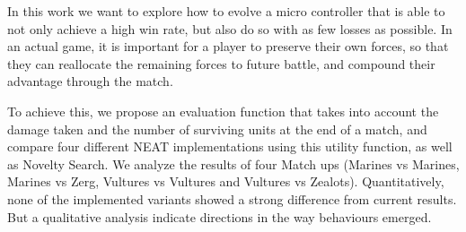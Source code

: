 In this work we want to explore how to evolve a micro controller that
is able to not only achieve a high win rate, but also do so with as
few losses as possible. In an actual game, it is important for a player
to preserve their own forces, so that they can reallocate the remaining
forces to future battle, and compound their advantage through the match.

To achieve this, we propose an evaluation function that takes into
account the damage taken and the number of surviving units at the end
of a match, and compare four different NEAT implementations using this
utility function, as well as Novelty Search. We analyze the results of
four Match ups (Marines vs Marines, Marines vs Zerg, Vultures vs
Vultures and Vultures vs Zealots). Quantitatively, none of the
implemented variants showed a strong difference from current
results. But a qualitative analysis indicate directions in the way
behaviours emerged.
